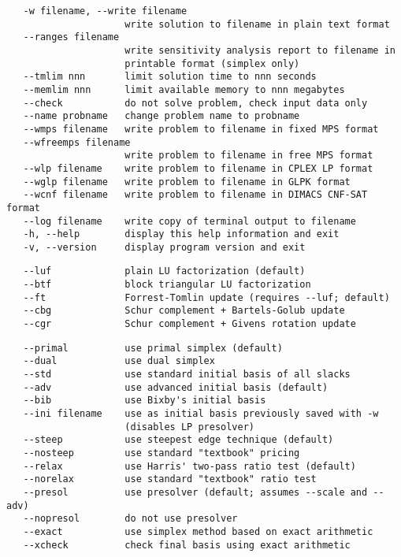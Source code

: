 \begin{verbatim}
   -w filename, --write filename
                     write solution to filename in plain text format
   --ranges filename
                     write sensitivity analysis report to filename in
                     printable format (simplex only)
   --tmlim nnn       limit solution time to nnn seconds
   --memlim nnn      limit available memory to nnn megabytes
   --check           do not solve problem, check input data only
   --name probname   change problem name to probname
   --wmps filename   write problem to filename in fixed MPS format
   --wfreemps filename
                     write problem to filename in free MPS format
   --wlp filename    write problem to filename in CPLEX LP format
   --wglp filename   write problem to filename in GLPK format
   --wcnf filename   write problem to filename in DIMACS CNF-SAT format
   --log filename    write copy of terminal output to filename
   -h, --help        display this help information and exit
   -v, --version     display program version and exit
\end{verbatim}


\begin{verbatim}
   --luf             plain LU factorization (default)
   --btf             block triangular LU factorization
   --ft              Forrest-Tomlin update (requires --luf; default)
   --cbg             Schur complement + Bartels-Golub update
   --cgr             Schur complement + Givens rotation update
\end{verbatim}


\begin{verbatim}
   --primal          use primal simplex (default)
   --dual            use dual simplex
   --std             use standard initial basis of all slacks
   --adv             use advanced initial basis (default)
   --bib             use Bixby's initial basis
   --ini filename    use as initial basis previously saved with -w
                     (disables LP presolver)
   --steep           use steepest edge technique (default)
   --nosteep         use standard "textbook" pricing
   --relax           use Harris' two-pass ratio test (default)
   --norelax         use standard "textbook" ratio test
   --presol          use presolver (default; assumes --scale and --adv)
   --nopresol        do not use presolver
   --exact           use simplex method based on exact arithmetic
   --xcheck          check final basis using exact arithmetic
\end{verbatim}

